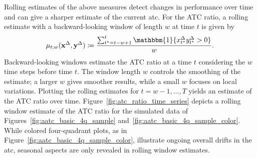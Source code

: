 \documentclass[pdflatex]{sn-jnl}
\theoremstyle{plain}%
\theoremstyle{definition}
\newcommand{\ind}[1]{\mathbbm{1}\{#1\}}
\newcommand{\diffx}{\mathbf{x}^{\Delta}}
\newcommand{\diffy}{\mathbf{y}^{\Delta}}
\newcommand{\diffxt}[1][t]{x^{\Delta}_{#1}}
\newcommand{\diffyt}[1][t]{y^{\Delta}_{#1}}
\newcommand{\acc}{\mu}
\begin{document}
Rolling estimates of the above measures detect changes in performance over time and can give a sharper estimate of the current \ac{atc}.
For the ATC ratio, a rolling estimate with a backward-looking window of length $w$ at time $t$ is given by
\begin{equation*}
    \acc_{t; w} (\diffx, \diffy) \coloneqq \frac{\sum_{t^\star = t-w + 1}^{t} \ind{\diffxt[t^\star] \diffyt[t^\star] > 0}}{w}.\label{eq:acc_rolling}
\end{equation*}
Backward-looking windows estimate the ATC ratio at a time $t$ considering the $w$ time steps before time $t$.
The window length $w$ controls the smoothing of the estimate; a larger $w$ gives smoother results, while a small $w$ focuses on local variations.
Plotting the rolling estimates for $t = w-1, \dots, T$ yields an estimate of the ATC ratio over time.
Figure~\ref{fig:atc_ratio_time_series} depicts a rolling window estimate of the ATC ratio for the simulated data of Figures~\ref{fig:aatc_basic_4q_sample} and~\ref{fig:aatc_basic_4q_sample_color}.
While colored four-quadrant plots, as in Figure~\ref{fig:aatc_basic_4q_sample_color}, illustrate ongoing overall drifts in the \ac{atc}, seasonal aspects are only revealed in rolling window estimates.
\end{document}
